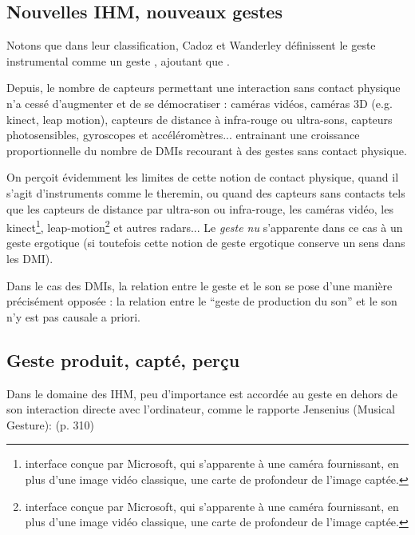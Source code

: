 \subsection{Nouvelles IHM, nouveaux gestes}

Notons que dans leur classification, Cadoz et Wanderley \cite{todo} définissent le geste instrumental comme un geste , ajoutant que .

Depuis, le nombre de capteurs permettant une interaction sans contact physique n'a cessé d'augmenter et de se démocratiser : caméras vidéos, caméras 3D (e.g. kinect, leap motion), capteurs de distance à infra-rouge ou ultra-sons, capteurs photosensibles, gyroscopes et accéléromètres... entrainant une croissance proportionnelle du nombre de DMIs recourant à des gestes sans contact physique.

On perçoit évidemment les limites de cette notion de contact physique, quand il s'agit d'instruments comme le theremin, ou quand des capteurs sans contacts tels que les capteurs de distance par ultra-son ou infra-rouge, les caméras vidéo, les kinect\footnote{interface conçue par Microsoft, qui s'apparente à une caméra fournissant, en plus d'une image vidéo classique, une carte de profondeur de l'image captée.}, leap-motion\footnote{interface conçue par Microsoft, qui s'apparente à une caméra fournissant, en plus d'une image vidéo classique, une carte de profondeur de l'image captée.} et autres radars... Le \textit{geste nu} s'apparente dans ce cas à un geste ergotique (si toutefois cette notion de geste ergotique conserve un sens dans les DMI).

Dans le cas des \glspl{DMI}, la relation entre le geste et le son se pose d'une manière précisément opposée : la relation entre le ``geste de production du son'' et le son n'y est pas causale a priori.

\subsection{Geste produit, capté, perçu}

Dans le domaine des IHM, peu d'importance est accordée au geste en dehors de son interaction directe avec l'ordinateur, comme le rapporte Jensenius (Musical Gesture):
(p. 310)\cite{kurtenbach_art_1990}

